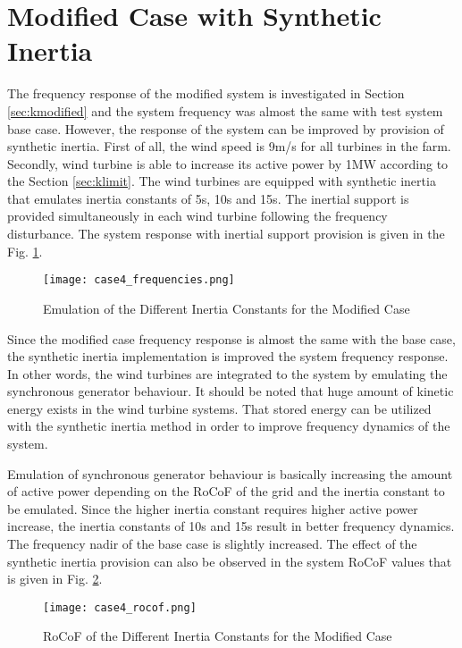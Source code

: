 \section{Modified Case with Synthetic Inertia}
The frequency response of the modified system is investigated in Section \ref{sec:kmodified} and the system frequency was almost the same with test system base case. However, the response of the system can be improved by provision of synthetic inertia. First of all, the wind speed is 9m/s for all turbines in the farm. Secondly, wind turbine is able to increase its active power by 1MW according to the Section \ref{sec:klimit}. The wind turbines are equipped with synthetic inertia that emulates inertia constants of 5s, 10s and 15s. The inertial support is provided simultaneously in each wind turbine following the frequency disturbance. The system response with inertial support provision is given in the Fig. \ref{Case4_freq}.\par
\begin{figure}[h]
	\centering
	\texttt{[image: case4\_frequencies.png]}
	\caption{Emulation of the Different Inertia Constants for the Modified Case}
	\label{Case4_freq}
\end{figure}
Since the modified case frequency response is almost the same with the base case, the synthetic inertia implementation is improved the system frequency response. In other words, the wind turbines are integrated to the system by emulating the synchronous generator behaviour. It should be noted that huge amount of kinetic energy exists in the wind turbine systems. That stored energy can be utilized with the synthetic inertia method in order to improve frequency dynamics of the system.\par
Emulation of synchronous generator behaviour is basically increasing the amount of active power depending on the RoCoF of the grid and the inertia constant to be emulated. Since the higher inertia constant requires higher active power increase, the inertia constants of 10s and 15s result in better frequency dynamics. The frequency nadir of the base case is slightly increased. The effect of the synthetic inertia provision can also be observed in the system RoCoF values that is given in Fig. \ref{Case4_rocof}.\par
\begin{figure}[h]
	\centering
	\texttt{[image: case4\_rocof.png]}
	\caption{RoCoF of the Different Inertia Constants for the Modified Case}
	\label{Case4_rocof}
\end{figure}
